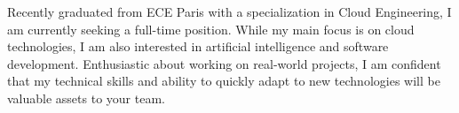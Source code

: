 

\begin{cvparagraph}


    Recently graduated from ECE Paris with a specialization in Cloud Engineering, I am currently seeking a full-time
    position.
    While my main focus is on cloud technologies, I am also interested in artificial intelligence and software
    development.
    Enthusiastic about working on real-world projects, I am confident that my technical skills and ability
    to quickly adapt to new technologies will be valuable assets to your team.


\end{cvparagraph}

